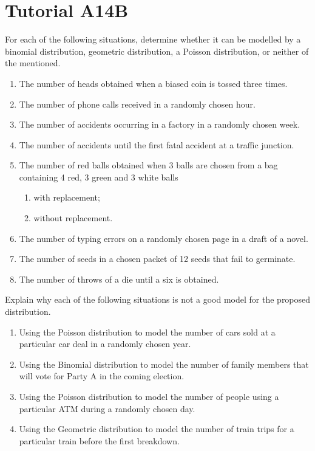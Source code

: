 \section{Tutorial A14B}

\begin{problem}
    For each of the following situations, determine whether it can be modelled by a binomial distribution, geometric distribution, a Poisson distribution, or neither of the mentioned.
    \begin{enumerate}
        \item The number of heads obtained when a biased coin is tossed three times.
        \item The number of phone calls received in a randomly chosen hour.
        \item The number of accidents occurring in a factory in a randomly chosen week.
        \item The number of accidents until the first fatal accident at a traffic junction.
        \item The number of red balls obtained when 3 balls are chosen from a bag containing 4 red, 3 green and 3 white balls
        \begin{enumerate}
            \item with replacement;
            \item without replacement.
        \end{enumerate}
        \item The number of typing errors on a randomly chosen page in a draft of a novel.
        \item The number of seeds in a chosen packet of 12 seeds that fail to germinate.
        \item The number of throws of a die until a six is obtained.
    \end{enumerate}
\end{problem}

\begin{problem}
    Explain why each of the following situations is not a good model for the proposed distribution.
    \begin{enumerate}
        \item Using the Poisson distribution to model the number of cars sold at a particular car deal in a randomly chosen year.
        \item Using the Binomial distribution to model the number of family members that will vote for Party A in the coming election.
        \item Using the Poisson distribution to model the number of people using a particular ATM during a randomly chosen day.
        \item Using the Geometric distribution to model the number of train trips for a particular train before the first breakdown.
    \end{enumerate}
\end{problem}

